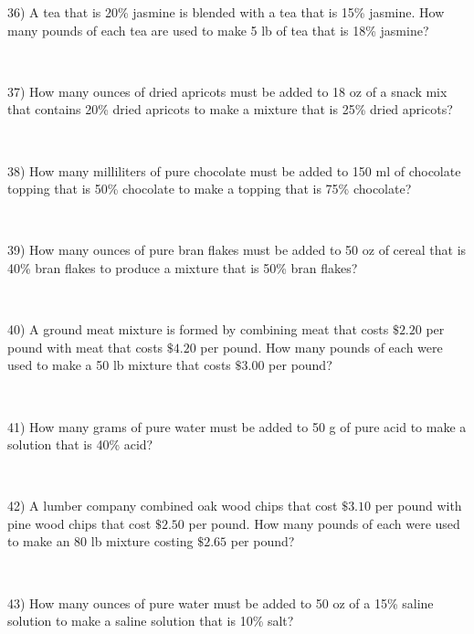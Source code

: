 {36) A tea that is 20\% jasmine is blended with a tea that is 15\% jasmine. How many pounds of each tea are used to make 5 lb of tea
that is 18\% jasmine?\par
~\par

37) How many ounces of dried apricots must be added to 18 oz of a snack mix that contains 20\% dried apricots to make a mixture that
is 25\% dried apricots?\par
~\par

38) How many milliliters of pure chocolate must be added to 150 ml of chocolate topping that is 50\% chocolate to make a topping that is 75\%
chocolate?\par
~\par

39) How many ounces of pure bran flakes must be added to 50 oz of cereal that is 40\% bran flakes to produce a mixture that is 50\% bran
flakes?\par
~\par

40) A ground meat mixture is formed by combining meat that costs $\$2.20$ per pound with meat that costs
$\$4.20$ per pound. How many pounds of each were used to make a 50 lb mixture that costs $\$3.00$ per pound?\par
~\par

41) How many grams of pure water must be added to 50 g of pure acid to make a solution that is 40\% acid?\par
~\par

42) A lumber company combined oak wood chips that cost $\$3.10$ per pound with pine wood chips that cost $\$2.50$ per pound.
How many pounds of each were used to make an 80 lb mixture
costing $\$2.65$ per pound?\par
~\par

43) How many ounces of pure water must be added to 50 oz of a 15\% saline solution to make a saline solution that is 10\% salt?

}
